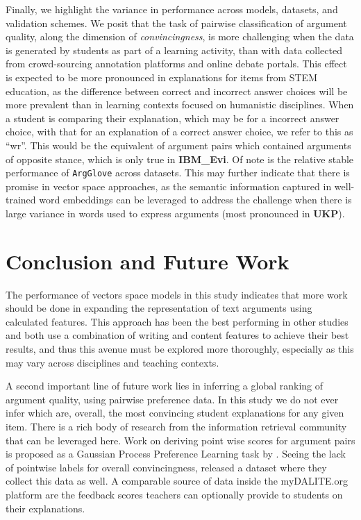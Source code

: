 \documentclass[runningheads]{llncs}
\begin{document}
Finally, we highlight the variance in performance across models, datasets, and 
validation schemes. We posit that the task of pairwise classification of 
argument quality, along the dimension of \textit{convincingness}, is more 
challenging when the data is generated by students as part of a learning 
activity, than with data collected from crowd-sourcing annotation platforms and 
online debate portals. 
This effect is expected to be more pronounced in explanations for items from 
STEM education, as the difference between correct and incorrect answer choices 
will be more prevalent than in learning contexts focused on humanistic 
disciplines.
When a student is comparing their explanation, which may be for a incorrect 
answer choice, with that for an explanation of a correct answer choice, we 
refer to this as ``wr''.
This would be the equivalent of argument pairs which contained arguments of 
opposite stance, which is only true in \textbf{IBM\_Evi}.  
Of note is the relative stable performance of \verb|ArgGlove| across datasets. 
This may further indicate that there is promise in vector space approaches, as 
the semantic information captured in well-trained word embeddings can be 
leveraged to address the challenge when there is large variance in words used 
to express arguments (most pronounced in \textbf{UKP}).


\section{Conclusion and Future Work}

The performance of vectors space models in this study indicates that more work 
should be done in expanding the representation of text arguments using 
calculated features.
This approach has been the best performing in other studies~\cite{louis_what_2013,nguyen_computational_2015} and both use a 
combination of writing and content features to achieve their best 
results, and thus this avenue must be explored more thoroughly, especially as 
this may vary across disciplines and teaching contexts. 

A second important line of future work lies in inferring a global ranking of 
argument quality, using pairwise preference data.
In this study we do not ever infer which are, overall, the most convincing 
student explanations for any given item. 
There is a rich body of research from the information retrieval 
community~\cite{chen_pairwise_2013} that can be leveraged here. 
Work on deriving point wise scores for argument pairs is proposed as a Gaussian 
Process Preference Learning task by \cite{simpson_finding_2018}. 
Seeing the lack of pointwise labels for overall convincingness, 
\cite{toledo_automatic_2019} released a dataset where they 
collect this data as well. 
A comparable source of data inside the myDALITE.org platform are the feedback 
scores teachers can optionally provide to students on their explanations.
\end{document}
